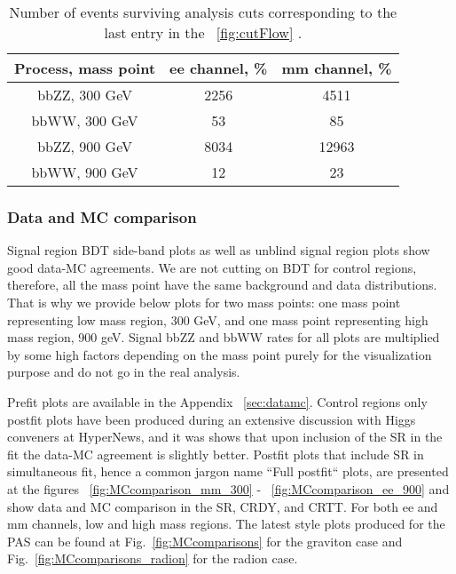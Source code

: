 \begin{table}
\begin{center}
\caption{Number of events surviving analysis cuts corresponding to the last entry in the ~\ref{fig:cutFlow} .}
\begin{tabular}{|c|c|c|} \hline
{Process, mass point} &  ee channel, \% &  mm channel, \% \\\hline
bbZZ, 300 GeV &                    2256     &                    4511 \\
bbWW, 300 GeV &                    53       &                    85 \\
bbZZ, 900 GeV &                    8034     &                    12963 \\
bbWW, 900 GeV &                    12       &                    23 \\\hline
\end{tabular}
\label{cutFlowEvents}
\end{center}
\end{table}






\subsubsection{Data and MC comparison\label{sec:compareDataMC}}
Signal region BDT side-band plots as well as unblind signal region plots show good data-MC agreements.
We are not cutting on BDT for control regions, therefore, all the mass
point have the same background and data distributions. 
That is
why we provide below plots for two mass points: one mass point representing low mass region, 300 GeV, and one mass point representing high mass region, 900 geV. 
Signal bbZZ and bbWW rates for all plots are multiplied by some high factors depending on the mass point purely for the visualization purpose and do not go in the real analysis. 

Prefit plots are available in the Appendix ~\ref{sec:datamc}. Control regions only postfit plots have been produced during an extensive discussion with Higgs conveners at HyperNews, and it was shows that upon inclusion of the SR in the fit the data-MC agreement is slightly better. Postfit plots that include SR in simultaneous fit, hence a common jargon name ``Full postfit`` plots, are presented at the figures ~\ref{fig:MCcomparison_mm_300} - ~\ref{fig:MCcomparison_ee_900} and show data and MC comparison in the SR, CRDY, and CRTT. For both ee and mm channels, low and high mass regions. The latest style plots produced for the PAS can be found at Fig.~\ref{fig:MCcomparisons} for the graviton case and Fig.~\ref{fig:MCcomparisons_radion} for the radion case. 



